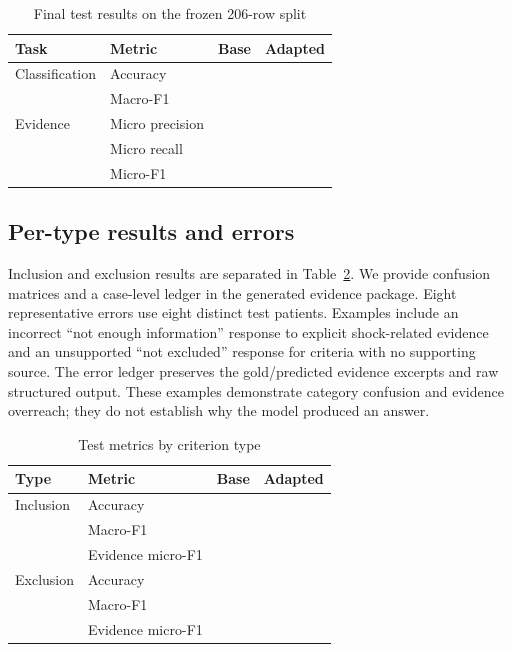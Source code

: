 ﻿\documentclass[conference]{IEEEtran}
\begin{document}
\begin{table}[t]
\caption{Final test results on the frozen 206-row split}
\label{tab:overall}
\centering\small
\begin{tabular}{llrr}
\toprule
Task & Metric & Base & Adapted\\
\midrule
Classification & Accuracy & \BaseAccuracy{} & \AdaptedAccuracy{}\\
 & Macro-F1 & \BaseMacroF{} & \AdaptedMacroF{}\\
Evidence & Micro precision & \BaseEvidenceP{} & \AdaptedEvidenceP{}\\
 & Micro recall & \BaseEvidenceR{} & \AdaptedEvidenceR{}\\
 & Micro-F1 & \BaseEvidenceF{} & \AdaptedEvidenceF{}\\
\bottomrule
\end{tabular}
\end{table}

\subsection{Per-type results and errors}
Inclusion and exclusion results are separated in Table~\ref{tab:types}. We provide confusion matrices and a case-level ledger in the generated evidence package. Eight representative errors use eight distinct test patients. Examples include an incorrect ``not enough information'' response to explicit shock-related evidence and an unsupported ``not excluded'' response for criteria with no supporting source. The error ledger preserves the gold/predicted evidence excerpts and raw structured output. These examples demonstrate category confusion and evidence overreach; they do not establish why the model produced an answer.

\begin{table}[t]
\caption{Test metrics by criterion type}
\label{tab:types}
\centering\small
\begin{tabular}{llrr}
\toprule
Type & Metric & Base & Adapted\\
\midrule
Inclusion & Accuracy & \BaseIncAcc{} & \AdaptedIncAcc{}\\
 & Macro-F1 & \BaseIncF{} & \AdaptedIncF{}\\
 & Evidence micro-F1 & \BaseIncEvidenceF{} & \AdaptedIncEvidenceF{}\\
Exclusion & Accuracy & \BaseExcAcc{} & \AdaptedExcAcc{}\\
 & Macro-F1 & \BaseExcF{} & \AdaptedExcF{}\\
 & Evidence micro-F1 & \BaseExcEvidenceF{} & \AdaptedExcEvidenceF{}\\
\bottomrule
\end{tabular}
\end{table}
\end{document}

